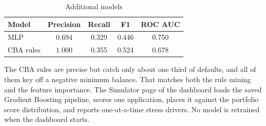 \begin{table}[H]
    \centering
    \small
    \begin{tabular}{|l|c|c|c|c|}
        \hline
        \textbf{Model} & \textbf{Precision} & \textbf{Recall} & \textbf{F1} & \textbf{ROC AUC} \\
        \hline
        MLP & 0.694 & 0.329 & 0.446 & 0.750 \\
        CBA rules & $\mathbf{1.000}$ & 0.355 & 0.524 & 0.678 \\
        \hline
    \end{tabular}
    \caption{Additional models}
    \label{tab:additional_models}
\end{table}

The CBA rules are precise but catch only about one third of defaults, and all of them key off a negative minimum balance. That matches both the rule mining and the feature importance. The Simulator page of the dashboard loads the saved Gradient Boosting pipeline, scores one application, places it against the portfolio score distribution, and reports one-at-a-time stress drivers. No model is retrained when the dashboard starts.
